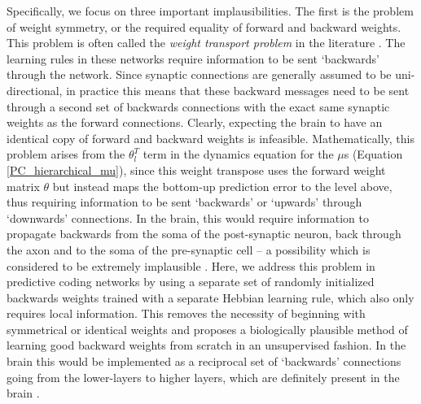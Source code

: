 Specifically, we focus on three important implausibilities.  The first is the problem of weight symmetry, or the required equality of forward and backward weights. This problem is often called the \emph{weight transport problem} in the literature \citep{lillicrap2016random,crick1989recent,lillicrap2020backpropagation}.  The learning rules in these networks require information to be sent `backwards' through the network. Since synaptic connections are generally assumed to be uni-directional, in practice this means that these backward messages need to be sent through a second set of backwards connections with the exact same synaptic weights as the forward connections. Clearly, expecting the brain to have an identical copy of forward and backward weights is infeasible. Mathematically, this problem arises from the $\theta_l^T$ term in the dynamics equation for the $\mu$s (Equation \ref{PC_hierarchical_mu}), since this weight transpose uses the forward weight matrix $\theta$ but instead maps the bottom-up prediction error to the level above, thus requiring information to be sent `backwards' or `upwards' through `downwards' connections. In the brain, this would require information to propagate backwards from the soma of the post-synaptic neuron, back through the axon and to the soma of the pre-synaptic cell -- a possibility which is considered to be extremely implausible \citep{lillicrap2014random}. Here, we address this problem in predictive coding networks by using a separate set of randomly initialized backwards weights trained with a separate Hebbian learning rule, which also only requires local information. This removes the necessity of beginning with symmetrical or identical weights and proposes a biologically plausible method of learning good backward weights from scratch in an unsupervised fashion. In the brain this would be implemented as a reciprocal set of `backwards' connections going from the lower-layers to higher layers, which are definitely present in the brain \citep{grill2004human}.

